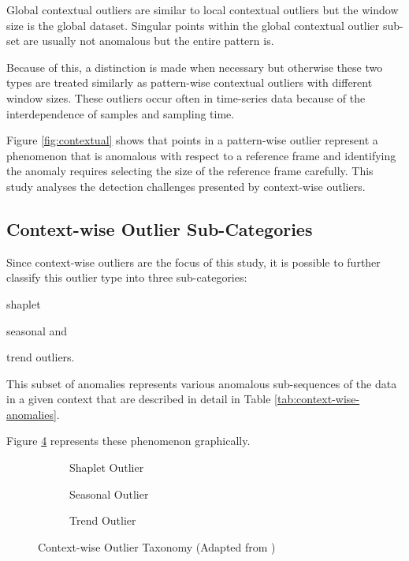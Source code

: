 Global contextual outliers are similar to local contextual outliers but the window size is the global dataset. Singular points within the global contextual outlier sub-set are usually not anomalous but the entire pattern is.

Because of this, a distinction is made when necessary but otherwise these two types are treated similarly as pattern-wise contextual outliers with different window sizes.
These outliers occur often in time-series data because of the interdependence of samples and sampling time.

Figure \ref{fig:contextual} shows that points in a pattern-wise outlier represent a phenomenon that is anomalous with respect to a reference frame and identifying the anomaly requires selecting the size of the reference frame carefully. This study analyses the detection challenges presented by context-wise outliers.


\subsection{Context-wise Outlier Sub-Categories}

Since context-wise outliers are the focus of this study, it is possible to further classify this outlier type into three sub-categories:
\begin{inlinelist}
    \item shaplet
    \item seasonal and
    \item trend outliers.
\end{inlinelist}
This subset of anomalies represents various anomalous sub-sequences of the data in a given context that are described in detail in Table \ref{tab:context-wise-anomalies}.



Figure \ref{fig:contextual-outliers} represents these phenomenon graphically.

\begin{figure}[H]
     \centering
     \begin{subfigure}[b]{0.3\textwidth}
         \centering
         {\resizebox{\textwidth}{!}{}}
         \caption{Shaplet Outlier}
         \label{fig:shaplet}
     \end{subfigure}
     \hfill
     \begin{subfigure}[b]{0.3\textwidth}
         \centering
         {\resizebox{\textwidth}{!}{}}
         \caption{Seasonal Outlier}
         \label{fig:seasonal}
     \end{subfigure}
     \hfill
     \begin{subfigure}[b]{0.3\textwidth}
         \centering
         {\resizebox{\textwidth}{!}{}}
         \caption{Trend Outlier}
         \label{fig:trend}
     \end{subfigure}
        \caption{Context-wise Outlier Taxonomy (Adapted from \cite{lai2021revisiting})}
        \label{fig:contextual-outliers}
\end{figure}

